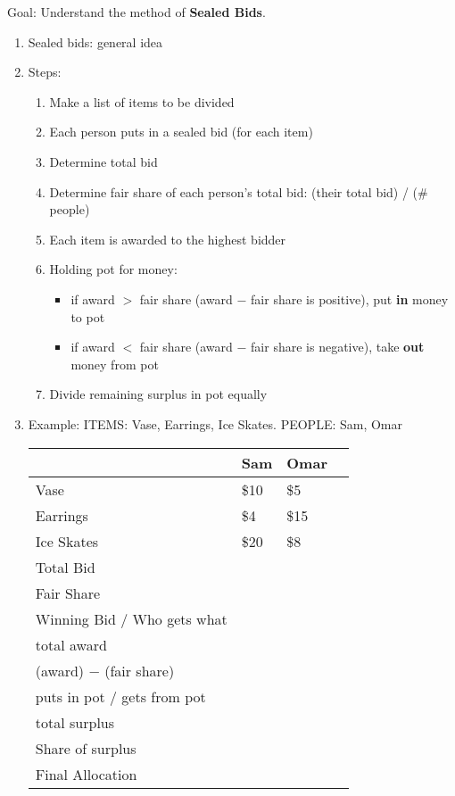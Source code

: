 \documentclass[12pt]{article}
\renewcommand{\emph}[1]{\textsf{\textbf{#1}}}
\begin{document}
Goal: Understand the method of \emph{Sealed Bids}.
\begin{enumerate}
\item Sealed bids: general idea
\vspace{1in}
\item Steps:
\begin{enumerate}
\item Make a list of items to be divided
\item Each person puts in a sealed bid (for each item)
\item Determine total bid
\item Determine fair share of each person's total bid: (their total bid) / (\# people)
\item Each item is awarded to the highest bidder
\item Holding pot for money: 
\begin{itemize}
\item if award $>$ fair share (award $-$ fair share is positive), put \emph{in} money to pot
\item if award $<$ fair share (award $-$ fair share is negative), take \emph{out} money from pot
\end{itemize}
\item Divide remaining surplus in pot equally
\end{enumerate}
\item Example: ITEMS: Vase, Earrings, Ice Skates. PEOPLE: Sam, Omar

\begin{tabular}{|p{2in} || p{2in} |p{2in} | p{1in}}
\hline
& Sam & Omar \\ \hline \hline
Vase & \$10 & \$5 \\[12 pt] \hline
Earrings & \$4 & \$15 \\[12 pt] \hline
Ice Skates & \$20 & \$8 \\[12 pt] \hline
Total Bid & & \\[12 pt] \hline
Fair Share & & \\[12 pt] \hline
 Winning Bid / Who gets what && \\[12pt] \hline
 total award && \\[12pt] \hline
 (award) $-$ (fair share) && \\[12 pt] \hline
 puts in pot / gets from pot && \\[12 pt] \hline
 total surplus && \\[12 pt] \hline
 Share of surplus && \\[12 pt] \hline
 Final Allocation && \\[24 pt] \hline


\end{tabular}
\end{enumerate}
\end{document}
